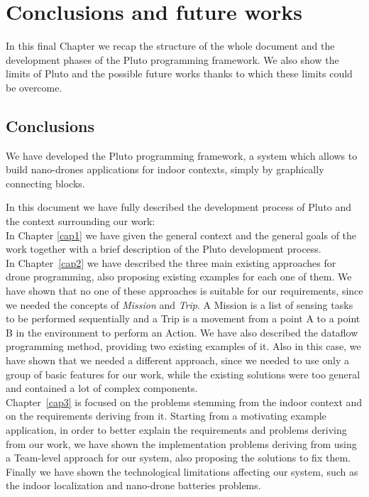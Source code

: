 \chapter{Conclusions and future works}
\label{cap7}

In this final Chapter we recap the structure of the whole document and the development phases of the Pluto programming framework.
We also show the limits of Pluto and the possible future works thanks to which these limits could be overcome.

\section{Conclusions}

We have developed the Pluto programming framework, a system which allows to build nano-drones applications for indoor contexts, simply by graphically connecting blocks.

In this document we have fully described the development process of Pluto and the context surrounding our work:
\\

In Chapter \ref{cap1} we have given the general context and the general goals of the work together with a brief description of the Pluto development process.
\\

In Chapter~\ref{cap2} we have described the three main existing approaches for drone programming, also proposing existing examples for each one of them.
We have shown that no one of these approaches is suitable for our requirements, since we needed the concepts of \textit{Mission} and \textit{Trip}.
A Mission is a list of sensing tasks to be performed sequentially and a Trip is a movement from a point A to a point B in the environment to perform an Action.
We have also described the dataflow programming method, providing two existing examples of it.
Also in this case, we have shown that we needed a different approach, since we needed to use only a group of basic features for our work, while the existing solutions were too general and contained a lot of complex components.
\\

Chapter~\ref{cap3} is focused on the problems stemming from the indoor context and on the requirements deriving from it.
Starting from a motivating example application, in order to better explain the requirements and problems deriving from our work, we have shown the implementation problems deriving from using a Team-level approach for our system, also proposing the solutions to fix them.
Finally we have shown the technological limitations affecting our system, such as the indoor localization and nano-drone batteries problems.
\\

